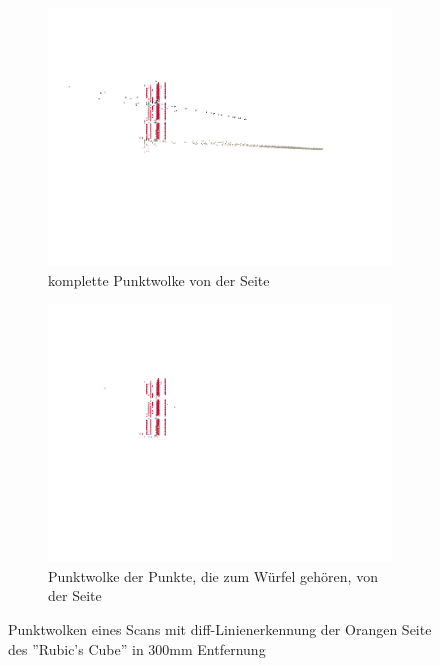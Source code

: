 \documentclass[ngerman,a4paper,parskip=half]{scrartcl}
\begin{document}
\begin{figure}[H]
\begin{subfigure}{0.45\textwidth}
		\includegraphics[width=\textwidth]{includes/diff_red_pos1.png}
		\caption{komplette Punktwolke von der Seite}
	\end{subfigure}
	\hfill
	\begin{subfigure}{0.45\textwidth}
		\includegraphics[width=\textwidth]{includes/diff_only_red_pos1.png}
		\caption{Punktwolke der Punkte, die zum Würfel gehören, von der Seite}
	\end{subfigure}
	\caption{Punktwolken eines Scans mit diff-Linienerkennung der Orangen Seite des ''Rubic's Cube'' in 300mm Entfernung}
\end{figure}
\end{document}
